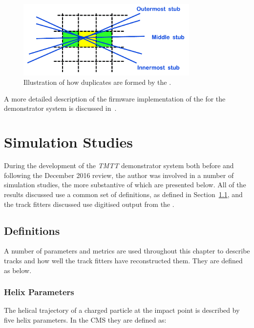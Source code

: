 \begin{figure}[!h]
\centering
\includegraphics[width=0.80\textwidth]{figs/tk-upgrade/A50_algo.pdf}
\caption{Illustration of how duplicates are formed by the \rphi \HT.}
\label{fig:DR}
\end{figure}

A more detailed description of the firmware implementation of the \DR for the demonstrator system is discussed in~\cite{TMTT_JINST}.

\section{Simulation Studies}\label{sec:TmttSimStudies}

During the development of the \emph{TMTT} demonstrator system both before and following the December 2016 review, the author was involved in a number of simulation studies, the more substantive of which are presented below.
All of the results discussed use a common set of definitions, as defined in Section~\ref{subsec:helixParameter}, and the track fitters discussed use digitised output from the \HT.

\subsection{Definitions}\label{subsec:helixParameter}
A number of parameters and metrics are used throughout this chapter to describe tracks and how well the track fitters have reconstructed them.
They are defined as below.

\subsubsection{Helix Parameters}
The helical trajectory of a charged particle at the impact point is described by five helix parameters.
In the CMS they are defined as:

